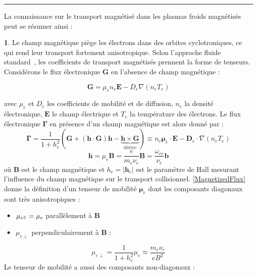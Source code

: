 \begin{refsection}
\begin{center}
\rule{0.5\textwidth}{1pt}
\end{center}


La connaissance sur le transport magnétisé dans les plasmas froids magnétisés
peut se résumer ainsi :

\textbf{1}. Le champ magnétique piège les électrons dans des orbites
cyclotroniques, ce qui rend leur transport fortement anisotropique. Selon
l'approche fluide standard~\parencite{Chen,Rozhansky,Lieberman,Rax}, les
coefficients de transport magnétisés prennent la forme de
tenseurs.
Considérons le flux électronique $\mathbf G$ en l'absence de champ magnétique :

\begin{equation}
\mathbf G = \mu_e n_e\mathbf E - D_e\nabla(n_eT_e)
\end{equation}

avec $\mu_e$ et $D_e$ les coefficients de mobilité et de diffusion, $n_e$ la
densité électronique, $\mathbf E$ le champ électrique et $T_e$ la température des électrons. Le flux
électronique $\boldsymbol{\Gamma}$ en présence d'un champ magnétique est alors
donné par :
\begin{equation}
\label{MagnetizedFlux}
\boldsymbol{\Gamma} = \frac{1}{1+h_e^2}(\mathbf G + (\mathbf
h\cdot\mathbf G)\mathbf h-\underbrace{\mathbf h\times\mathbf
G}_\text{dérive})\equiv n_e\boldsymbol{\mu}_e\cdot\mathbf
E-\mathbf{D}_e\cdot\nabla(n_eT_e)
\end{equation}
\begin{equation}
\mathbf h=\mu_e\mathbf B=\frac{e}{m_e\nu_e}\mathbf
B=\frac{\omega_{ce}}{\nu_e}\mathbf b
\end{equation}
où $\mathbf B$ est le champ magnétique et $h_e=|\mathbf h_e|$ est le paramètre
de Hall mesurant l'influence du champ
magnétique sur le transport collisionnel. \eqref{MagnetizedFlux} donne la
définition d'un tenseur de mobilité $\boldsymbol{\mu}_e$ dont les composants
diagonaux sont très anisotropiques :
 
\begin{itemize}
  \item $\mu_{e\para}=\mu_e$ parallèlement à $\mathbf B$
  \item $\mu_{e\perp}$ perpendiculairement à $\mathbf B$ :
\end{itemize}

\begin{equation}
\mu_{e\perp}=\frac{1}{1+h_e^2}\mu_e\approx\frac{m_e\nu_e}{eB^2}
\end{equation}
Le tenseur de mobilité a aussi des composants non-diagonaux :


\end{refsection}

